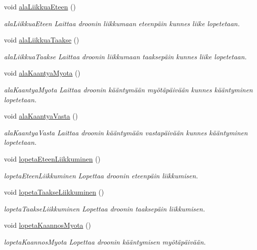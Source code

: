 \begin{DoxyCompactItemize}
\item 
void \hyperlink{class_drooni_a13704789c83b2a871aa9ae0a0b8344f0}{ala\-Liikkua\-Eteen} ()
\begin{DoxyCompactList}\small\item\em ala\-Liikkua\-Eteen Laittaa droonin liikkumaan eteenpäin kunnes liike lopetetaan. \end{DoxyCompactList}\item 
void \hyperlink{class_drooni_a00017b1e9eb860c06d4422d7a60a0809}{ala\-Liikkua\-Taakse} ()
\begin{DoxyCompactList}\small\item\em ala\-Liikkua\-Taakse Laittaa droonin liikkumaan taaksepäin kunnes liike lopetetaan. \end{DoxyCompactList}\item 
void \hyperlink{class_drooni_ad1a61ea9bd674ad83267ea9259d3a807}{ala\-Kaantya\-Myota} ()
\begin{DoxyCompactList}\small\item\em ala\-Kaantya\-Myota Laittaa droonin kääntymään myötäpäivään kunnes kääntyminen lopetetaan. \end{DoxyCompactList}\item 
void \hyperlink{class_drooni_ad6bbe6b848b5e3c52afcf6b13258dc4b}{ala\-Kaantya\-Vasta} ()
\begin{DoxyCompactList}\small\item\em ala\-Kaantya\-Vasta Laittaa droonin kääntymään vastapäivään kunnes kääntyminen lopetetaan. \end{DoxyCompactList}\item 
void \hyperlink{class_drooni_ae27475e5b09619e4b635b5109f9378f9}{lopeta\-Eteen\-Liikkuminen} ()
\begin{DoxyCompactList}\small\item\em lopeta\-Eteen\-Liikkuminen Lopettaa droonin eteenpäin liikkumisen. \end{DoxyCompactList}\item 
void \hyperlink{class_drooni_ab44ae640ee3c0d47839188e0d4946d34}{lopeta\-Taakse\-Liikkuminen} ()
\begin{DoxyCompactList}\small\item\em lopeta\-Taakse\-Liikkuminen Lopettaa droonin taaksepäin liikkumisen. \end{DoxyCompactList}\item 
void \hyperlink{class_drooni_ab849dde58e4cadd190f694b0610e2215}{lopeta\-Kaannos\-Myota} ()
\begin{DoxyCompactList}\small\item\em lopeta\-Kaannos\-Myota Lopettaa droonin kääntymisen myötäpäivään. \end{DoxyCompactList}\item 

\end{DoxyCompactItemize}
